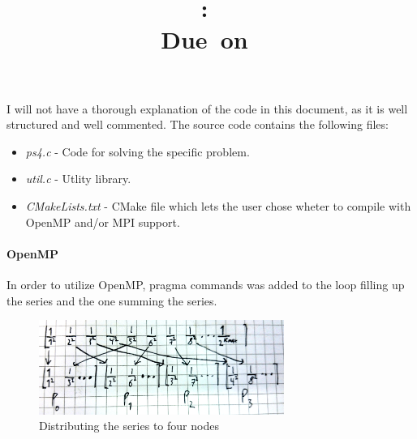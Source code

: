 \documentclass{article}
\title{
\vspace{2in}
\textmd{\textbf{\exClass:\ \exTitle}}\\
\normalsize\vspace{0.1in}\small{Due\ on\ \exDueDate}\\
\vspace{3in}
}
\author{\textbf{\authorName}}
\date{} %
\begin{document}
\maketitle
\newpage

I will not have a thorough explanation of the code in this document, as it is well structured and well commented. The source code contains the following files:
\begin{itemize}
	\item \emph{ps4.c} - Code for solving the specific problem.
	\item \emph{util.c} - Utlity library.
	\item \emph{CMakeLists.txt} - CMake file which lets the user chose wheter to compile with OpenMP and/or MPI support.
\end{itemize}

\paragraph{OpenMP}
In order to utilize OpenMP, pragma commands was added to the loop filling up the series and the one summing the series.

\begin{figure}[h]
	\centering
	\includegraphics[width=8cm]{img/node_distribute.png}
	\caption{Distributing the series to four nodes}
	\label{fig:node_distribute}
\end{figure}
\end{document}
